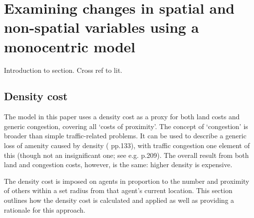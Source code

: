 
\section{Examining changes in spatial and non-spatial variables using a monocentric model \label{sec:testspace}}

Introduction to section. Cross ref to lit. 



\subsection{Density cost \label{sec:densitycostsetup}}

The model in this paper uses a density cost as a proxy for both land costs and generic congestion, covering all `costs of proximity'. The concept of `congestion' is broader than simple traffic-related problems. It can be used to describe a generic loss of amenity caused by density (\citealt{glaeser_cities_2008} pp.133), with traffic congestion one element of this (though not an insignificant one; see e.g. \citealt{glaeser_cities_2004} p.209). The overall result from both land and congestion costs, however, is the same: higher density is expensive. 

The density cost is imposed on agents in proportion to the number and proximity of others within a set radius from that agent's current location. This section outlines how the density cost is calculated and applied as well as providing a rationale for this approach. 

